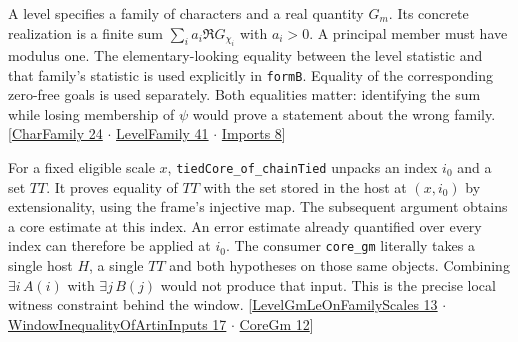 \documentclass[12pt,letterpaper]{article}
\newcommand{\id}[1]{{\small\nolinkurl{#1}}}
\begin{document}
A level specifies a family of characters and a real quantity $G_m$. Its concrete realization is a finite sum $\sum_i a_i\Re G_{\chi_i}$ with $a_i>0$. A principal member must have modulus one. The elementary-looking equality between the level statistic and that family's statistic is used explicitly in \id{formB}. Equality of the corresponding zero-free goals is used separately. Both equalities matter: identifying the sum while losing membership of $\psi$ would prove a statement about the wrong family. {\small\sffamily\color{mute}[\href{https://github.com/nousentllc/riemann-hypothesis/blob/40e56bab026552e089d7afcfeff08d2defb9c005/src/Development/AutomorphicArithmetic/DedekindLFunctions/CharFamily.lean#L24}{CharFamily 24} $\cdot$ \href{https://github.com/nousentllc/riemann-hypothesis/blob/40e56bab026552e089d7afcfeff08d2defb9c005/src/Development/AutomorphicArithmetic/PrimitiveCosets/LevelFamily.lean#L41}{LevelFamily 41} $\cdot$ \href{https://github.com/nousentllc/riemann-hypothesis/blob/40e56bab026552e089d7afcfeff08d2defb9c005/src/Development/AutomorphicArithmetic/PrimitiveCosets/Imports.lean#L8}{Imports 8}]}

For a fixed eligible scale $x$, \id{tiedCore_of_chainTied} unpacks an index $i_0$ and a set $TT$. It proves equality of $TT$ with the set stored in the host at $(x,i_0)$ by extensionality, using the frame's injective map. The subsequent argument obtains a core estimate at this index. An error estimate already quantified over every index can therefore be applied at $i_0$. The consumer \id{core_gm} literally takes a single host $H$, a single $TT$ and both hypotheses on those same objects. Combining $\exists i\,A(i)$ with $\exists j\,B(j)$ would not produce that input. This is the precise local witness constraint behind the window. {\small\sffamily\color{mute}[\href{https://github.com/nousentllc/riemann-hypothesis/blob/40e56bab026552e089d7afcfeff08d2defb9c005/src/Development/AutomorphicArithmetic/PrimitiveCosets/LevelGmLeOnFamilyScales.lean#L13}{LevelGmLeOnFamilyScales 13} $\cdot$ \href{https://github.com/nousentllc/riemann-hypothesis/blob/40e56bab026552e089d7afcfeff08d2defb9c005/src/Development/AutomorphicArithmetic/PrimitiveCosets/WindowInequalityOfArtinInputs.lean#L17}{WindowInequalityOfArtinInputs 17} $\cdot$ \href{https://github.com/nousentllc/riemann-hypothesis/blob/40e56bab026552e089d7afcfeff08d2defb9c005/src/Development/AutomorphicArithmetic/PrimitiveCosets/CoreGm.lean#L12}{CoreGm 12}]}
\end{document}
